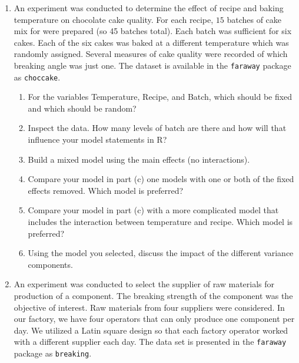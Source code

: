 \documentclass[]{book}
\providecommand{\tightlist}{%
  \setlength{\itemsep}{0pt}\setlength{\parskip}{0pt}}
\theoremstyle{definition}
\theoremstyle{definition}
\theoremstyle{remark}
\begin{document}
\begin{enumerate}
\def\labelenumi{\arabic{enumi}.}
\item
  An experiment was conducted to determine the effect of recipe and
  baking temperature on chocolate cake quality. For each recipe, \(15\)
  batches of cake mix for were prepared (so 45 batches total). Each
  batch was sufficient for six cakes. Each of the six cakes was baked at
  a different temperature which was randomly assigned. Several measures
  of cake quality were recorded of which breaking angle was just one.
  The dataset is available in the \texttt{faraway} package as
  \texttt{choccake}.

  \begin{enumerate}
  \def\labelenumii{\alph{enumii}.}
  \tightlist
  \item
    For the variables Temperature, Recipe, and Batch, which should be
    fixed and which should be random?
  \item
    Inspect the data. How many levels of batch are there and how will
    that influence your model statements in R?
  \item
    Build a mixed model using the main effects (no interactions).
  \item
    Compare your model in part (c) one models with one or both of the
    fixed effects removed. Which model is preferred?
  \item
    Compare your model in part (c) with a more complicated model that
    includes the interaction between temperature and recipe. Which model
    is preferred?
  \item
    Using the model you selected, discuss the impact of the different
    variance components.
  \end{enumerate}
\item
  An experiment was conducted to select the supplier of raw materials
  for production of a component. The breaking strength of the component
  was the objective of interest. Raw materials from four suppliers were
  considered. In our factory, we have four operators that can only
  produce one component per day. We utilized a Latin square design so
  that each factory operator worked with a different supplier each day.
  The data set is presented in the \texttt{faraway} package as
  \texttt{breaking}.


\end{enumerate}
\end{document}
